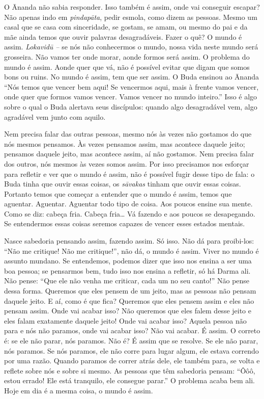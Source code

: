 O \=Ananda não sabia responder. Isso também é assim, onde vai
conseguir escapar? Não apenas indo em \textit{pindap\=ata}, pedir
esmola, como dizem as pessoas. Mesmo um casal que se casa com
sinceridade, se gostam, se amam, ou mesmo do pai e da mãe ainda temos
que ouvir palavras desagradáveis. Fazer o quê? O mundo é assim.
\textit{Lokavid\=u – }se nós não conhecermos o mundo, nossa vida neste
mundo será grosseira. Não vamos ter onde morar, aonde formos será
assim. O problema do mundo é assim. Aonde quer que vá, não é possível
evitar que digam que somos bons ou ruins. No mundo é assim, tem que ser
assim. O Buda ensinou ao \=Ananda “Nós temos que vencer bem aqui! Se
vencermos aqui, mais à frente vamos vencer, onde quer que formos vamos
vencer. Vamos vencer no mundo inteiro.” Isso é algo sobre o qual o Buda
alertava seus discípulos: quando algo desagradável vem, algo agradável
vem junto com aquilo.

Nem precisa falar das outras pessoas, mesmo nós às vezes não
gostamos do que nós mesmos pensamos. Às vezes pensamos assim, mas
acontece daquele jeito; pensamos daquele jeito, mas acontece assim, aí
não gostamos. Nem precisa falar dos outros, nós mesmos às vezes somos
assim. Por isso precisamos nos esforçar para refletir e ver que o mundo
é assim, não é possível fugir desse tipo de fala: o Buda tinha que
ouvir essas coisas, os \textit{s\=avakas} tinham que ouvir essas
coisas. Portanto temos que começar a entender que o mundo é assim,
temos que aguentar. Aguentar. Aguentar todo tipo de coisa. Aos poucos
ensine sua mente. Como se diz: cabeça fria. Cabeça fria… Vá fazendo e
aos poucos se desapegando. Se entendermos essas coisas seremos capazes
de vencer esses estados mentais.

Nasce sabedoria pensando assim, fazendo assim. Só isso. Não dá para
proibi-los: “Não me critique! Não me critique!”, não dá, o mundo é
assim. Viver no mundo é assunto mundano. Se entendemos, podemos dizer
que isso nos ensina a ser uma boa pessoa; se pensarmos bem, tudo isso
nos ensina a refletir, só há Darma ali. Não pense: “Que ele não venha
me criticar, cada um no seu canto!” Não pense dessa forma. Queremos que
eles pensem de um jeito, mas as pessoas não pensam daquele jeito. E aí,
como é que fica? Queremos que eles pensem assim e eles não pensam
assim. Onde vai acabar isso? Não queremos que eles falem desse jeito e
eles falam exatamente daquele jeito! Onde vai acabar isso? Aquela
pessoa não para e nós não paramos, onde vai acabar isso? Não vai
acabar. É assim. O correto é: se ele não parar, nós paramos. Não é? É
assim que se resolve. Se ele não parar, nós paramos. Se nós paramos,
ele não corre para lugar algum, ele estava correndo por uma razão.
Quando paramos de correr atrás dele, ele também para, se volta e
reflete sobre nós e sobre si mesmo. As pessoas que têm sabedoria
pensam: “Ôôô, estou errado! Ele está tranquilo, ele consegue parar.” O
problema acaba bem ali. Hoje em dia é a mesma coisa, o mundo é assim.

